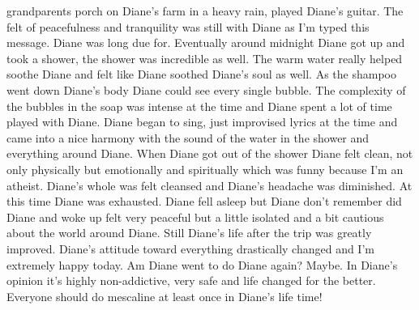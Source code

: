 \documentclass[12pt]{book}
\begin{document}
grandparents porch on Diane's farm in a heavy rain, played Diane's guitar. The felt of peacefulness and tranquility was still with Diane as I'm typed this message. Diane was long due for. Eventually around midnight Diane got up and took a shower, the shower was incredible as well. The warm water really helped soothe Diane and felt like Diane soothed Diane's soul as well. As the shampoo went down Diane's body Diane could see every single bubble. The complexity of the bubbles in the soap was intense at the time and Diane spent a lot of time played with Diane. Diane began to sing, just improvised lyrics at the time and came into a nice harmony with the sound of the water in the shower and everything around Diane. When Diane got out of the shower Diane felt clean, not only physically but emotionally and spiritually which was funny because I'm an atheist. Diane's whole was felt cleansed and Diane's headache was diminished. At this time Diane was exhausted. Diane fell asleep but Diane don't remember did Diane and woke up felt very peaceful but a little isolated and a bit cautious about the world around Diane. Still Diane's life after the trip was greatly improved. Diane's attitude toward everything drastically changed and I'm extremely happy today. Am Diane went to do Diane again? Maybe. In Diane's opinion it's highly non-addictive, very safe and life changed for the better. Everyone should do mescaline at least once in Diane's life time!
\end{document}
